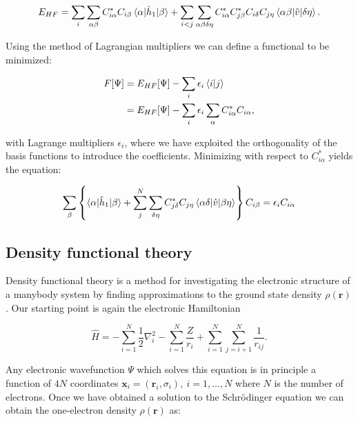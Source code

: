 $$ E_{HF} = \sum_i \sum_{\alpha \beta}
    C_{i \alpha}^* C_{i\beta} \braket{\alpha | \hat{h}_1 | \beta}
    + \sum_{i < j} \sum_{\alpha \beta \delta \eta}
    C_{i\alpha}^* C_{j\beta}^* C_{i\delta} C_{j\eta}
    \braket{\alpha \beta | \hat{v} | \delta \eta} .$$

Using the method of Lagrangian multipliers
we can define a functional to be minimized:

\begin{equation}
\begin{split}
F[\Psi] &= E_{HF}[\Psi] - \sum_i \epsilon_i \braket{i | j} \\
        &= E_{HF}[\Psi] - \sum_i \epsilon_i \sum_{\alpha}
        C_{i\alpha}^* C_{i\alpha} ,
\end{split}
\end{equation}

with Lagrange multipliers $\epsilon_i$, where we have
exploited the orthogonality of the basis functions to
introduce the coefficients.
Minimizing with respect to $C_{i\alpha}^*$ yields
the equation:

\begin{equation}
\sum_{\beta} \left\{ \braket{\alpha | \hat{h}_1 | \beta} 
+ \sum_j^N \sum_{\delta \eta} C_{j\delta}^* C_{j\eta} 
\braket{\alpha \delta | \hat{v} | \beta \eta} \right\} 
C_{i\beta} = \epsilon_i C_{i\alpha}
\end{equation}

\subsection{Density functional theory}
Density functional theory is a method for
investigating the electronic structure of a manybody system
by finding approximations to the ground state
density $\rho(\bm{r})$. Our starting point
is again the electronic Hamiltonian

\begin{equation}
    \hat{H} = -\sum_{i=1}^N \frac{1}{2} \nabla_i^2
    - \sum_{i=1}^N \frac{Z}{r_{i}} + \sum_{i=1}^N \sum_{j=i+1}^N
    \frac{1}{r_{ij}} .
\end{equation}

Any electronic wavefunction $\Psi$ which solves this equation
is in principle a function of $4N$ coordinates $\bm{x}_i = (\bm{r}_i, \sigma_i)
, \ i=1,\dots,N$
where $N$ is the number of electrons.
Once we have obtained a solution to the Schr\"{o}dinger equation
we can obtain the one-electron density $\rho(\bm{r})$ as:


